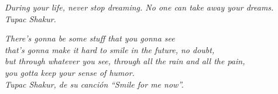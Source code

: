 
%
%
%

\thispagestyle{empty}
\vspace*{3.5cm}
\begin{flushright}

\emph{During your life, never stop dreaming. No one can take away your dreams.}\\
\vspace*{0.5cm} \emph{Tupac Shakur.}

\vfill

\emph{
There's gonna be some stuff that you gonna see\\that's gonna make it hard to smile in the future, no doubt,\\but through whatever you see, through all the rain and all the pain,\\you gotta keep your sense of humor.}\\
\vspace*{0.5cm} \emph{Tupac Shakur, de su canci{\'o}n ``Smile for me now''.}

\vfill




\end{flushright}
